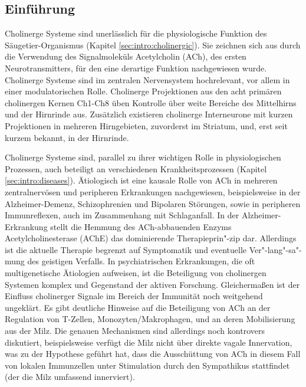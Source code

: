 \subsection{Einführung}
Cholinerge Systeme sind unerlässlich für die physiologische Funktion des Säugetier-Organismus (Kapitel \ref{sec:intro:cholinergic}). Sie zeichnen sich aus durch die Verwendung des Signalmoleküls Acetylcholin (ACh), des ersten Neurotransmitters, für den eine derartige Funktion nachgewiesen wurde. Cholinerge Systeme sind im zentralen Nervensystem hochrelevant, vor allem in einer modulatorischen Rolle. Cholinerge Projektionen aus den acht primären cholinergen Kernen Ch1-Ch8 üben Kontrolle über weite Bereiche des Mittelhirns und der Hirnrinde aus. Zusätzlich existieren cholinerge Interneurone mit kurzen Projektionen in mehreren Hirngebieten, zuvorderst im Striatum, und, erst seit kurzem bekannt, in der Hirnrinde.

Cholinerge Systeme sind, parallel zu ihrer wichtigen Rolle in physiologischen Prozessen, auch beteiligt an verschiedenen Krankheitsprozessen (Kapitel \ref{sec:intro:diseases}). Ätiologisch ist eine kausale Rolle von ACh in mehreren zentralnervösen und peripheren Erkrankungen nachgewiesen, beispielsweise in der Alzheimer-Demenz, Schizophrenien und Bipolaren Störungen, sowie in peripheren Immunreflexen, auch im Zusammenhang mit Schlaganfall. In der Alzheimer-Erkrankung stellt die Hemmung des ACh-abbauenden Enzyms Acetylcholinesterase (AChE) das dominierende Therapieprin"-zip dar. Allerdings ist die aktuelle Therapie begrenzt auf Symptomatik und eventuelle Ver"-lang"-sa"-mung des geistigen Verfalls. In psychiatrischen Erkrankungen, die oft multigenetische Ätiologien aufweisen, ist die Beteiligung von cholinergen Systemen komplex und Gegenstand der aktiven Forschung. Gleichermaßen ist der Einfluss cholinerger Signale im Bereich der Immunität noch weitgehend ungeklärt. Es gibt deutliche Hinweise auf die Beteiligung von ACh an der Regulation von T-Zellen, Monozyten/Makrophagen, und an deren Mobilisierung aus der Milz. Die genauen Mechanismen sind allerdings noch kontrovers diskutiert, beispielsweise verfügt die Milz nicht über direkte vagale Innervation, was zu der Hypothese geführt hat, dass die Ausschüttung von ACh in diesem Fall von lokalen Immunzellen unter Stimulation durch den Sympathikus stattfindet (der die Milz umfassend innerviert).


